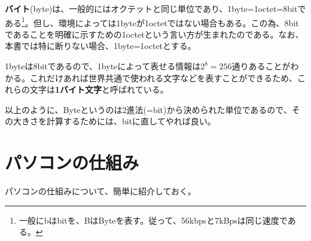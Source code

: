 \textbf{バイト}(byte)は、一般的にはオクテットと同じ単位であり、1byte=1octet=8bitである\footnote{一般にbはbitを、BはByteを表す。従って、56kbpsと7kBpsは同じ速度である。}。但し、環境によっては1byteが1octetではない場合もある。この為、8bitであることを明確に示すための1octetという言い方が生まれたのである。なお、本書では特に断りない場合、1byte=1octetとする。

1byteは8bitであるので、1byteによって表せる情報は$2^8=256$通りあることがわかる。これだけあれば世界共通で使われる文字などを表すことができるため、これらの文字は\textbf{1バイト文字}と呼ばれている。

以上のように、Byteというのは2進法(=bit)から決められた単位であるので、その大きさを計算するためには、bitに直してやれば良い。

\section{パソコンの仕組み}
パソコンの仕組みについて、簡単に紹介しておく。
